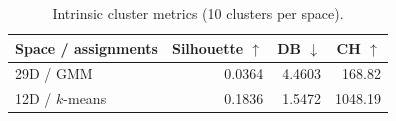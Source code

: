 \begin{table}[H]
\centering\footnotesize\setlength{\tabcolsep}{3pt}
\caption{Intrinsic cluster metrics (10 clusters per space).}
\label{tab:geometry}
\begin{tabular}{@{}lrrr@{}}
\toprule
Space / assignments & Silhouette $\uparrow$ & DB $\downarrow$ & CH $\uparrow$ \\
\midrule
29D / GMM & 0.0364 & 4.4603 & 168.82 \\
12D / $k$-means & 0.1836 & 1.5472 & 1048.19 \\
\bottomrule
\end{tabular}
\end{table}
